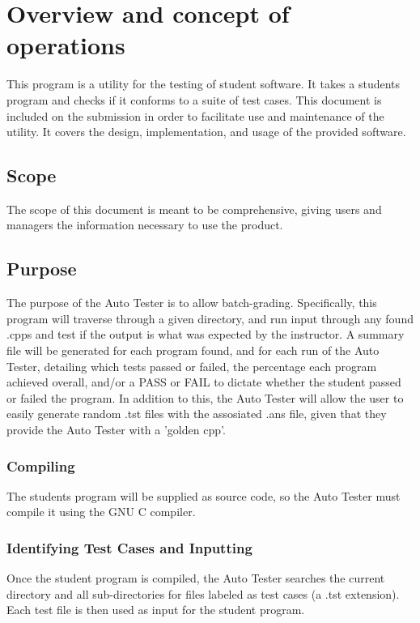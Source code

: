 
\chapter{Overview and concept of operations}
This program is a utility for the testing of student software. It takes a students program 
and checks if it conforms to a suite of test cases. This document is included on the 
submission in order to facilitate use and maintenance of the utility. It covers the 
design, implementation, and usage of the provided software.


\section{Scope}
The scope of this document is meant to be comprehensive, giving users and managers the 
information necessary to use the product.


\section{Purpose}
The purpose of the Auto Tester is to allow batch-grading. Specifically, this program 
will traverse through a given directory, and run input through any found .cpps and 
test if the output is what was expected by the instructor. A summary file will be 
generated for each program found, and for each run of the Auto Tester, 
detailing which tests passed or failed, the percentage each program achieved overall, and/or 
a PASS or FAIL to dictate whether the student passed or failed the program. In addition to this, 
the Auto Tester will allow the user to easily generate random .tst files with the assosiated .ans 
file, given that they provide the Auto Tester with a 'golden cpp'.

\subsection{Compiling}
The students program will be supplied as source code, so the Auto Tester must compile it using the 
GNU C compiler.


\subsection{Identifying Test Cases and Inputting}
Once the student program is compiled, the Auto Tester searches the current directory and all 
sub-directories for files labeled as test cases (a .tst extension). Each test file is then 
used as input for the student program.


